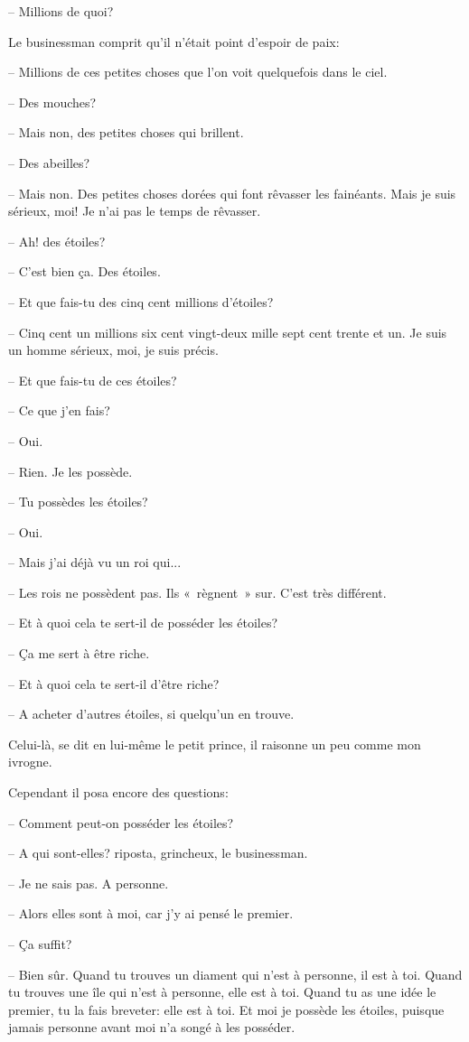 \documentclass[a4paper]{report}
\begin{document}
-- Millions de quoi?

Le businessman comprit qu'il n'était point d'espoir de paix:

-- Millions de ces petites choses que l'on voit quelquefois dans le ciel.

-- Des mouches?

-- Mais non, des petites choses qui brillent.

-- Des abeilles?

-- Mais non. Des petites choses dorées qui font rêvasser les fainéants. Mais je suis sérieux, moi! Je n'ai pas le temps de rêvasser.

-- Ah! des étoiles?

-- C'est bien ça. Des étoiles.

-- Et que fais-tu des cinq cent millions d'étoiles?

-- Cinq cent un millions six cent vingt-deux mille sept cent trente et un. Je suis un homme sérieux, moi, je suis précis.

-- Et que fais-tu de ces étoiles?

-- Ce que j'en fais?

-- Oui.

-- Rien. Je les possède.

-- Tu possèdes les étoiles?

-- Oui.

-- Mais j'ai déjà vu un roi qui...

-- Les rois ne possèdent pas. Ils «~règnent~» sur. C'est très différent.

-- Et à quoi cela te sert-il de posséder les étoiles?

-- Ça me sert à être riche.

-- Et à quoi cela te sert-il d'être riche?

-- A acheter d'autres étoiles, si quelqu'un en trouve.

Celui-là, se dit en lui-même le petit prince, il raisonne un peu comme mon ivrogne.

Cependant il posa encore des questions:

-- Comment peut-on posséder les étoiles?

-- A qui sont-elles? riposta, grincheux, le businessman.

-- Je ne sais pas. A personne.

-- Alors elles sont à moi, car j'y ai pensé le premier.

-- Ça suffit?

-- Bien sûr. Quand tu trouves un diament qui n'est à personne, il est à toi. Quand tu trouves une île qui n'est à personne, elle est à toi. Quand tu as une idée le premier, tu la fais breveter: elle est à toi. Et moi je possède les étoiles, puisque jamais personne avant moi n'a songé à les posséder.
\end{document}
